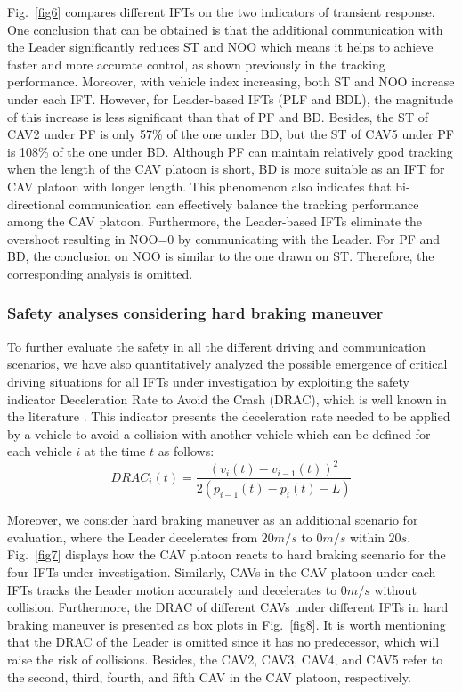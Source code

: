 \documentclass[a4paper]{cas-sc}
\begin{document}
Fig.~\ref{fig6} compares different IFTs on the two indicators of transient response. One conclusion that can be obtained is that the additional communication with the Leader significantly reduces ST and NOO which means it helps to achieve faster and more accurate control, as shown previously in the tracking performance. Moreover, with vehicle index increasing, both ST and NOO increase under each IFT. However, for Leader-based IFTs (PLF and BDL), the magnitude of this increase is less significant than that of PF and BD. Besides, the ST of CAV2 under PF is only 57\% of the one under BD, but the ST of CAV5 under PF is 108\% of the one under BD. Although PF can maintain relatively good tracking when the length of the CAV platoon is short, BD is more suitable as an IFT for CAV platoon with longer length. This phenomenon also indicates that bi-directional communication can effectively balance the tracking performance among the CAV platoon. Furthermore, the Leader-based IFTs eliminate the overshoot resulting in NOO=0 by communicating with the Leader. For PF and BD, the conclusion on NOO is similar to the one drawn on ST. Therefore, the corresponding analysis is omitted.


\subsubsection{Safety analyses considering hard braking maneuver}
\label{Section 5.2.2}

To further evaluate the safety in all the different driving and communication scenarios, we have also quantitatively analyzed the possible emergence of critical driving situations for all IFTs under investigation by exploiting the safety indicator Deceleration Rate to Avoid the Crash (DRAC), which is well known in the literature \citep{fu2021comparison,fu2021random}. This indicator presents the deceleration rate needed to be applied by a vehicle to avoid a collision with another vehicle which can be defined for each vehicle $i$ at the time $t$ as follows:
\begin{equation}
  DRA{C_i}(t) = \frac{{{{\left( {{v_i}(t) - {v_{i - 1}}(t)} \right)}^2}}}{{2\left( {{p_{i - 1}}(t) - {p_i}(t) - L} \right)}}
  \label{eq522}
\end{equation}

Moreover, we consider hard braking maneuver as an additional scenario for evaluation, where the Leader decelerates from $20m/s$ to $0m/s$ within $20s$. Fig.~\ref{fig7} displays how the CAV platoon reacts to hard braking scenario for the four IFTs under investigation. Similarly, CAVs in the CAV platoon under each IFTs tracks the Leader motion accurately and decelerates to $0m/s$ without collision. Furthermore, the DRAC of different CAVs under different IFTs in hard braking maneuver is presented as box plots in Fig.~\ref{fig8}. It is worth mentioning that the DRAC of the Leader is omitted since it has no predecessor, which will raise the risk of collisions. Besides, the CAV2, CAV3, CAV4, and CAV5 refer to the second, third, fourth, and fifth CAV in the CAV platoon, respectively.
\end{document}
